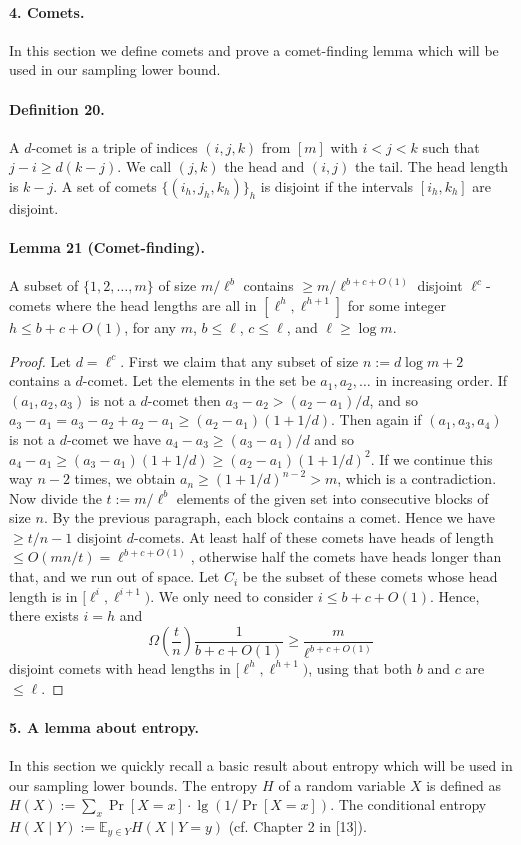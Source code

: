 \paragraph{4. Comets.}
In this section we define comets and prove a comet-finding lemma which will be used in our sampling lower bound.
\paragraph{Definition 20.}
A $d$-comet is a triple of indices $(i,j,k)$ from $[m]$ with $i<j<k$ such that $j-i\geq d(k-j)$. We call $(j,k)$ the head and $(i,j)$ the tail. The head length is $k-j$. A set of comets $\{(i_h,j_h,k_h)\}_h$ is disjoint if the intervals $[i_h,k_h]$ are disjoint.
\paragraph{Lemma 21 (Comet-finding).}
A subset of $\{1,2,\ldots,m\}$ of size $m/\ell^b$ contains $\geq m/\ell^{b+c+O(1)}$ disjoint $\ell^c$-comets where the head lengths are all in $[\ell^h,\ell^{h+1}]$ for some integer $h\leq b+c+O(1)$, for any $m$, $b\leq\ell$, $c\leq\ell$, and $\ell\geq\log m$.
\begin{proof}
Let $d=\ell^c$. First we claim that any subset of size $n:=d\log m+2$ contains a $d$-comet. Let the elements in the set be $a_1,a_2,\ldots$ in increasing order. If $(a_1,a_2,a_3)$ is not a $d$-comet then $a_3-a_2>(a_2-a_1)/d$, and so $a_3-a_1=a_3-a_2+a_2-a_1\geq(a_2-a_1)(1+1/d)$. Then again if $(a_1,a_3,a_4)$ is not a $d$-comet we have $a_4-a_3\geq(a_3-a_1)/d$ and so $a_4-a_1\geq(a_3-a_1)(1+1/d)\geq(a_2-a_1)(1+1/d)^2$. If we continue this way $n-2$ times, we obtain $a_n\geq(1+1/d)^{n-2}>m$, which is a contradiction.
Now divide the $t:=m/\ell^b$ elements of the given set into consecutive blocks of size $n$. By the previous paragraph, each block contains a comet. Hence we have $\geq t/n-1$ disjoint $d$-comets.
At least half of these comets have heads of length $\leq O(mn/t)=\ell^{b+c+O(1)}$, otherwise half the comets have heads longer than that, and we run out of space. Let $C_i$ be the subset of these comets whose head length is in $[\ell^i,\ell^{i+1})$. We only need to consider $i\leq b+c+O(1)$. Hence, there exists $i=h$ and
\[\Omega\left(\frac tn\right)\frac1{b+c+O(1)}\geq\frac m{\ell^{b+c+O(1)}}\]
disjoint comets with head lengths in $[\ell^h,\ell^{h+1})$, using that both $b$ and $c$ are $\leq\ell$.
\end{proof}
\paragraph{5. A lemma about entropy.}
In this section we quickly recall a basic result about entropy which will be used in our sampling lower bounds. The entropy $H$ of a random variable $X$ is defined as $H(X):=\sum_x\Pr[X=x]\cdot\lg(1/\Pr[X=x])$. The conditional entropy $H(X\mid Y):=\mathbb E_{y\in Y}H(X\mid Y=y)$ (cf. Chapter 2 in [13]).
